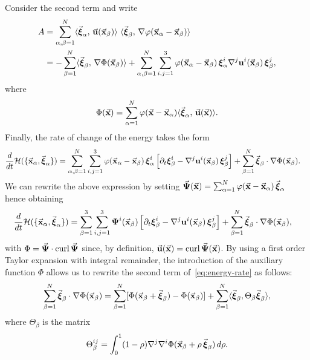 \documentclass[a4paper,11pt]{article}
\numberwithin{equation}{section}
\newcommand{\la}{\langle}
\newcommand{\ra}{\rangle}
\newcommand{\U}{\mbox{$\vec{\bf u}$}}
\newcommand{\UU}{\mbox{${\bf u}$}}
\newcommand{\vPsi}{\mbox{$\vec{\boldsymbol \Psi}$}}
\newcommand{\x}{\mbox{$\vec{\bf x}$}}
\newcommand{\bxi}{\mbox{$\vec{\boldsymbol \xi}$}}
\newcommand{\bbxi}{\mbox{${\boldsymbol \xi}$}}
\begin{document}
Consider the second term and write
\begin{equation*}
  \begin{split}
A & = \sum_{\alpha,\beta=1}^N \la\bxi_{\alpha},\,\U(\x_\beta)\ra\ 
\la \bxi_\beta,\,\nabla \varphi(\x_\alpha-\x_\beta)\ra \\ 
& = - \sum_{\beta=1}^N \la\bxi_\beta,\,\nabla \Phi(\x_\beta)\ra +
 \sum_{\alpha,\beta=1}^N \sum_{i,j=1}^3 \varphi(\x_\alpha-\x_\beta)\,
 \bbxi_{\alpha}^i \nabla^j\UU^i(\x_\beta)\,\bbxi_\beta^j,
  \end{split}
\end{equation*}
where
$$ 
\Phi(\x) = \sum_{\alpha=1}^N \varphi(\x-\x_\alpha)
\la\bxi_{\alpha},\,\U(\x)\ra. 
$$
Finally, the rate of change of the energy takes the form
\begin{equation*}
\begin{split}
\frac{d}{dt}\mathcal{H}(\{\x_\alpha, \bxi_\alpha\}) & =
\sum_{\alpha,\beta=1}^N\sum_{i,j=1}^3  \varphi(\x_\alpha-\x_\beta)\, \bbxi_\alpha^i
\left[ {\partial_t \bbxi}_\beta^i -\nabla^j \UU^i(\x_\beta)
  \,\bbxi_\beta^j\right] + \sum_{\beta=1}^N  \bxi_\beta \cdot\nabla
\Phi(\x_\beta).  
  \end{split}
\end{equation*}
We can rewrite the above expression by setting
$\vPsi(\x) = \sum_{\alpha=1}^N \varphi(\x-\x_\alpha)\, \bxi_{\alpha}$
hence obtaining
\begin{equation}
\label{eq:energy-rate}
  \begin{split}
 \frac{d}{dt}\mathcal{H}(\{\x_\alpha , \bxi_\alpha\}) & =
 \sum_{\beta=1}^3\sum_{i,j=1}^3
\boldsymbol{\Psi}^i(\x_\beta) \left[ {\partial_t \bbxi}_\beta^i -
\nabla^j \UU^i(\x_\beta)\,\bbxi_\beta^j\right]+ 
\sum_{\beta=1}^N \bxi_\beta \cdot \nabla\Phi(\x_\beta), 
  \end{split}
\end{equation}
with $\Phi = \vPsi \cdot \text{curl\,} \vPsi$ since, by definition,
$\U(\x) = \text{curl\,} \vPsi(\x)$. By using a first order Taylor
expansion with integral remainder, the introduction of the auxiliary
function $\Phi$ allows us to rewrite the second term
of~\eqref{eq:energy-rate} as follows:  
\begin{equation}
\label{eq:int-by-parts}
\sum_{\beta=1}^N \bxi_\beta \cdot \nabla\Phi(\x_\beta) = 
  \sum_{\beta=1}^N [\Phi(\x_\beta+\bxi_\beta) - \Phi(\x_\beta)]
+ \sum_{\beta=1}^N \la \bxi_\beta, \Theta_\beta \bxi_\beta\ra,
\end{equation}
where $\Theta_\beta$ is the matrix
\begin{equation*}
\Theta_\beta^{ij} = \int_0^1 (1-\rho) 
\nabla^j \nabla^i \Phi(\x_\beta+\rho\,
\bxi_\beta)\,d\rho.
\end{equation*}
\end{document}
